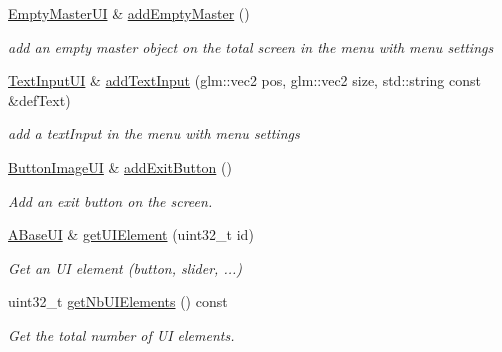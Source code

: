 \begin{DoxyCompactItemize}
\hyperlink{class_empty_master_u_i}{Empty\+Master\+UI} \& \hyperlink{class_a_scene_menu_a59dfc339cc860204011104cb6598162c}{add\+Empty\+Master} ()
\begin{DoxyCompactList}\small\item\em add an empty master object on the total screen in the menu with menu settings \end{DoxyCompactList}\item 
\hyperlink{class_text_input_u_i}{Text\+Input\+UI} \& \hyperlink{class_a_scene_menu_a17b4546a13c714760dbc18f496361bc3}{add\+Text\+Input} (glm\+::vec2 pos, glm\+::vec2 size, std\+::string const \&def\+Text)
\begin{DoxyCompactList}\small\item\em add a text\+Input in the menu with menu settings \end{DoxyCompactList}\item 
\hyperlink{class_button_image_u_i}{Button\+Image\+UI} \& \hyperlink{class_a_scene_menu_ac1883fd509d5ac2306e009bd2cead752}{add\+Exit\+Button} ()
\begin{DoxyCompactList}\small\item\em Add an exit button on the screen. \end{DoxyCompactList}\item 
\hyperlink{class_a_base_u_i}{A\+Base\+UI} \& \hyperlink{class_a_scene_menu_a251ef83adb546bb22915f52986bc7d84}{get\+U\+I\+Element} (uint32\+\_\+t id)
\begin{DoxyCompactList}\small\item\em Get an UI element (button, slider, ...) \end{DoxyCompactList}\item 
uint32\+\_\+t \hyperlink{class_a_scene_menu_a13b29d13f531109e90428c6f14d50e05}{get\+Nb\+U\+I\+Elements} () const
\begin{DoxyCompactList}\small\item\em Get the total number of UI elements. \end{DoxyCompactList}\end{DoxyCompactItemize}

